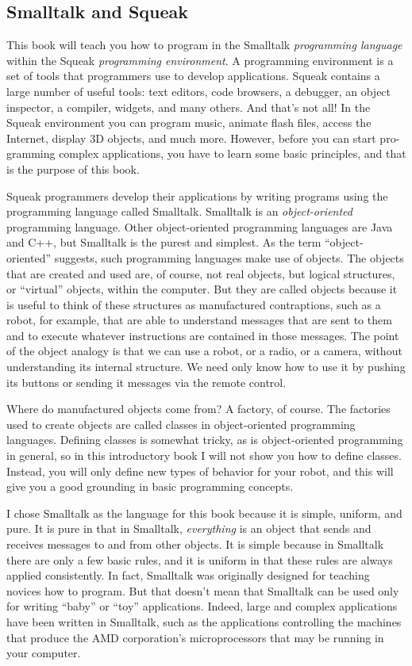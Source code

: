 \documentclass[a4paper,10pt,twoside]{book}
\begin{document}
\subsection{Smalltalk and Squeak}
This book will teach you how to program in the Smalltalk \emph{programming language} within the Squeak \emph{programming environment}. A programming environment is a set of tools that programmers use to develop applications. Squeak contains a large number of useful tools: text 
editors, code browsers, a debugger, an object inspector, a compiler, widgets, and many others. 
And that’s not all! In the Squeak environment you can program music, animate flash files, 
access the Internet, display 3D objects, and much more. However, before you can start pro- 
gramming complex applications, you have to learn some basic principles, and that is the 
purpose of this book. 

Squeak programmers develop their applications by writing programs using the programming language called Smalltalk. Smalltalk is an \emph{object-oriented} programming language. Other 
object-oriented programming languages are Java and C++, but Smalltalk is the purest and 
simplest. As the term “object-oriented” suggests, such programming languages make use of 
objects. The objects that are created and used are, of course, not real objects, but logical structures, or “virtual” objects, within the computer. But they are called objects because it is useful to think of these structures as manufactured contraptions, such as a robot, for example, that are able to understand messages that are sent to them and to execute whatever instructions are contained in those messages. The point of the object analogy is that we can use a robot, or a radio, or a camera, without understanding its internal structure. We need only know how to use it by pushing its buttons or sending it messages via the remote control. 

Where do manufactured objects come from? A factory, of course. The factories used to 
create objects are called classes in object-oriented programming languages. Defining classes is somewhat tricky, as is object-oriented programming in general, so in this introductory book I will not show you how to define classes. Instead, you will only define new types of behavior for your robot, and this will give you a good grounding in basic programming concepts. 

I chose Smalltalk as the language for this book because it is simple, uniform, and pure. It 
is pure in that in Smalltalk, \emph{everything} is an object that sends and receives messages to and from other objects. It is simple because in Smalltalk there are only a few basic rules, and it is uniform in that these rules are always applied consistently. In fact, Smalltalk was originally designed for teaching novices how to program. But that doesn’t mean that Smalltalk can be used only for writing “baby” or “toy” applications. Indeed, large and complex applications have been written in Smalltalk, such as the applications controlling the machines that produce the AMD corporation’s microprocessors that may be running in your computer. 
\end{document}
